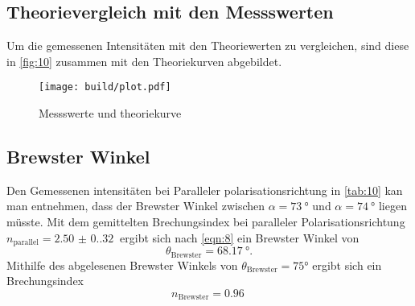 \subsection{Theorievergleich mit den Messswerten}
Um die gemessenen Intensitäten mit den Theoriewerten zu vergleichen, sind 
diese in \autoref{fig:10} zusammen mit den Theoriekurven abgebildet. 
\begin{figure}[H]
  \centering 
  \caption{Messswerte und theoriekurve}
  \label{fig:10}
  \texttt{[image: build/plot.pdf]}
\end{figure}
\subsection{Brewster Winkel}
Den Gemessenen intensitäten bei Paralleler polarisationsrichtung in \autoref{tab:10} kan man entnehmen, dass 
der Brewster Winkel zwischen $\alpha = \qty{73}{\degree}$ und $\alpha = \qty{74}{\degree}$ liegen müsste. Mit dem 
gemittelten Brechungsindex bei paralleler Polarisationsrichtung $n_\text{parallel} = \qty{2.50(0.32)}{}$ ergibt sich nach \autoref{eqn:8}
ein Brewster Winkel von
\begin{equation}
 \theta_\text{Brewster} = \qty{68.17}{\degree}.
\end{equation}
Mithilfe des abgelesenen Brewster Winkels von $\theta_\text{Brewster}=75\unit{\degree}$
ergibt sich ein Brechungsindex
\begin{equation}
 n_\text{Brewster} = \qty{0.96}{}
\end{equation}
